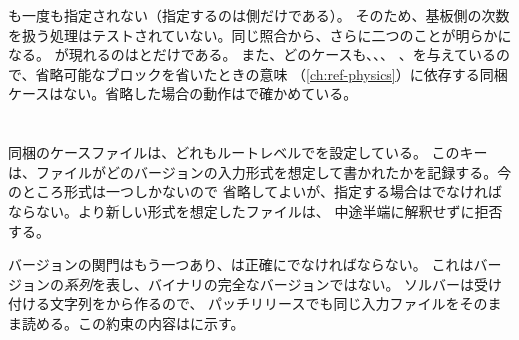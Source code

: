 も一度も指定されない（指定するのは側だけである）。
そのため、基板側の次数を扱う処理はテストされていない。同じ照合から、さらに二つのことが明らかになる。
が現れるのはとだけである。
また、どのケースも、、、
、を与えているので、省略可能なブロックを省いたときの意味
（\cref{ch:ref-physics}）に依存する同梱ケースはない。省略した場合の動作はで確かめている。

\section{}
\label{sec:ref-numerics:formatversion}

同梱のケースファイルは、どれもルートレベルでを設定している。
このキーは、ファイルがどのバージョンの入力形式を想定して書かれたかを記録する。今のところ形式は一つしかないので
省略してよいが、指定する場合はでなければならない。より新しい形式を想定したファイルは、
中途半端に解釈せずに拒否する。

バージョンの関門はもう一つあり、は正確にでなければならない。
これはバージョンの\emph{系列}を表し、バイナリの完全なバージョンではない。
ソルバーは受け付ける文字列をから作るので、
パッチリリースでも同じ入力ファイルをそのまま読める。この約束の内容はに示す。
